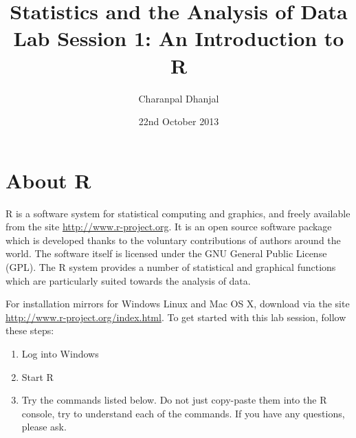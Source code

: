 \documentclass[a4paper,10pt]{article}
\title{Statistics and the Analysis of Data\\ Lab Session 1: An Introduction to R}
\author{Charanpal Dhanjal}
\begin{document}
\date{22nd October 2013}
\maketitle

\section{About R}

R is a software system for statistical computing and graphics, and  freely available from the site \url{http://www.r-project.org}. It is an open source software package which is developed thanks to the voluntary contributions of authors around the world. The software itself is licensed under the GNU General Public License (GPL). The R system provides a number of statistical and graphical functions which are particularly suited towards the analysis of data. 

For installation mirrors for Windows Linux and Mac OS X, download via the site \url{http://www.r-project.org/index.html}. To get started with this lab session, follow these steps: 
\begin{enumerate}
 \item Log into Windows 
 \item Start R 
 \item Try the commands listed below. Do not just copy-paste them into the R console, try to understand each of the commands. If you have any questions, please ask. 
\end{enumerate}
\end{document}
